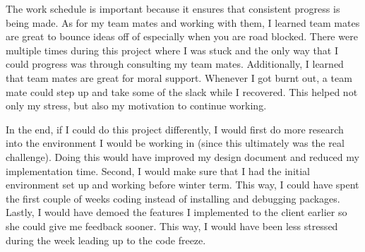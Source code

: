 \documentclass[10pt,journal,compsoc,draftclsnofoot]{IEEEtran}
\begin{document}
\begin{flushleft}
The work schedule is important because it ensures that consistent progress is being made.
As for my team mates and working with them, I learned team mates are great to bounce ideas off of especially when you are road blocked.
There were multiple times during this project where I was stuck and the only way that I could progress was through consulting my team mates.
Additionally, I learned that team mates are great for moral support.
Whenever I got burnt out, a team mate could step up and take some of the slack while I recovered.
This helped not only my stress, but also my motivation to continue working. \par
\vspace{3mm}
In the end, if I could do this project differently, I would first do more research into the environment I would be working in (since this ultimately was the real challenge).
Doing this would have improved my design document and reduced my implementation time.
Second, I would make sure that I had the initial environment set up and working before winter term.
This way, I could have spent the first couple of weeks coding instead of installing and debugging packages.
Lastly, I would have demoed the features I implemented to the client earlier so she could give me feedback sooner.
This way, I would have been less stressed during the week leading up to the code freeze.

\end{flushleft}
\end{document}
